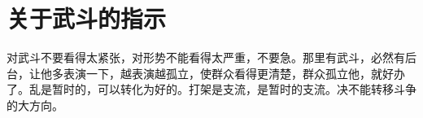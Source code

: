 \section[关于武斗的指示（一九六七年八月）]{关于武斗的指示}


对武斗不要看得太紧张，对形势不能看得太严重，不要急。那里有武斗，必然有后台，让他多表演一下，越表演越孤立，使群众看得更清楚，群众孤立他，就好办了。乱是暂时的，可以转化为好的。打架是支流，是暂时的支流。决不能转移斗争的大方向。

